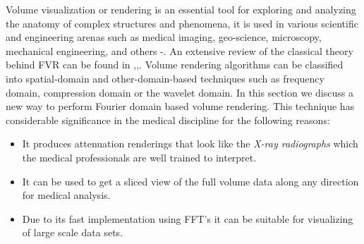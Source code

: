 \documentclass{UCF_ETD}
\begin{document}
Volume visualization or rendering is an essential tool for exploring and
analyzing the anatomy of complex structures and phenomena, it is used in various scientific and
engineering arenas such as medical imaging, geo-science, microscopy, mechanical engineering, and others \cite{Elvins1991}-\cite{Preim2007}. An extensive review of the classical theory behind FVR can be found in \cite{Levoy1992},\cite{Malzbender1993},\cite{Totsuka1993}. Volume rendering algorithms can be classified into spatial-domain and other-domain-based techniques such as frequency domain, compression domain or the wavelet domain. In this section we discuss a new way to perform Fourier domain based volume rendering. This technique has considerable significance in the medical discipline for the following reasons: 
\begin{itemize}
\item It produces attenuation renderings that look like the \emph{X-ray radiographs} which the medical professionals are well trained to interpret.
\item It can be used to get a sliced view of the full volume data along any direction for medical analysis.
\item Due to its fast implementation using FFT's it can be suitable for visualizing of large scale data sets.
\end{itemize}
\end{document}
